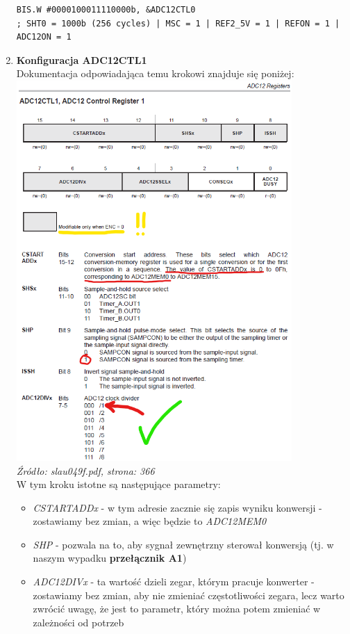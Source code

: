 \documentclass{article}
\begin{document}
\begin{enumerate}[label=\arabic*.]
\begin{verbatim}
BIS.W #0000100011110000b, &ADC12CTL0
; SHT0 = 1000b (256 cycles) | MSC = 1 | REF2_5V = 1 | REFON = 1 | ADC12ON = 1 \end{verbatim}
    \item \textbf{Konfiguracja ADC12CTL1}
    \vspace{3mm} \\
Dokumentacja odpowiadająca temu krokowi znajduje się poniżej: \\
\includegraphics[width=0.825\textwidth]{"../img/slau049f_366.png"} \\
\textit{Źródło: slau049f.pdf, strona: 366}
\vspace{3mm} \\
W tym kroku istotne są następujące parametry:
\begin{itemize}
     \item \textit{CSTARTADDx} - w tym adresie zacznie się zapis wyniku konwersji - zostawiamy bez zmian, a więc będzie to \textit{ADC12MEM0}
     \item \textit{SHP} - pozwala na to, aby sygnał zewnętrzny sterował konwersją (tj. w naszym wypadku \textbf{przełącznik A1})
     \item \textit{ADC12DIVx} - ta wartość dzieli zegar, którym pracuje konwerter - zostawiamy bez zmian, aby nie zmieniać częstotliwości zegara, lecz warto zwrócić uwagę, że jest to parametr, który można potem zmieniać w zależności od potrzeb

\end{itemize}
\end{enumerate}
\end{document}

